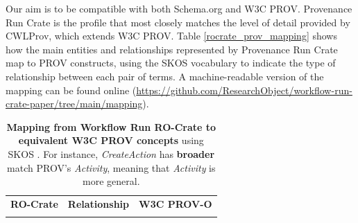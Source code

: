 \documentclass[10pt,letterpaper]{article}
\newlength\savedwidth
\newcommand\thickhline{\noalign{\global\savedwidth\arrayrulewidth\global\arrayrulewidth 2pt}%
\hline
\noalign{\global\arrayrulewidth\savedwidth}}
\begin{document}
Our aim is to be compatible with both Schema.org and W3C PROV. Provenance Run Crate is the profile that most closely matches the level of detail provided by CWLProv, which extends W3C PROV. Table \ref{rocrate_prov_mapping} shows how the main entities and relationships represented by Provenance Run Crate map to PROV constructs, using the SKOS vocabulary to indicate the type of relationship between each pair of terms. A machine-readable version of the mapping can be found online (\url{https://github.com/ResearchObject/workflow-run-crate-paper/tree/main/mapping}).

\begin{table}[!ht]
  \begin{adjustwidth}{-1.5cm}{0in}
  \centering
  \caption{
  {\bf Mapping from Workflow Run RO-Crate to equivalent W3C PROV concepts} using SKOS \cite{Isaac 2009}. For instance, \emph{CreateAction} has \textbf{broader} match PROV's \emph{Activity}, meaning that \emph{Activity} is more general.}
  \begin{tabular}{p{35mm}|p{40mm}|p{40mm}}
  \hline
  {\bf RO-Crate} & \textbf{Relationship} & {\bf W3C PROV-O} \\
  \thickhline


\end{tabular}
\end{adjustwidth}
\end{table}
\end{document}
